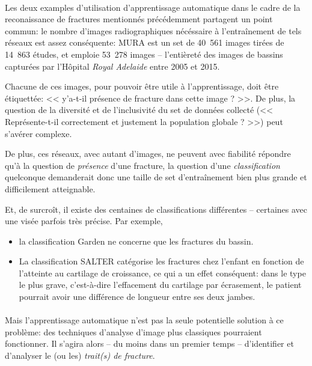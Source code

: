 \documentclass[a4paper]{article}
\begin{document}
\paragraph{}

Les deux examples d'utilisation d'apprentissage automatique dans le cadre de la reconaissance de fractures mentionnés
précédemment partagent un point commun: le nombre d'images radiographiques nécéssaire à l'entraînement de tels réseaux
est assez conséquente: MURA\cite{mura-competition} est un set de 40~561 images tirées de 14~863 études, et
\cite{detect-hip} emploie 53~278 images -- l'entièreté des images de bassins capturées par l'Hôpital \emph{Royal
Adelaide} entre 2005 et 2015.


Chacune de ces images, pour pouvoir être utile à l'apprentissage, doit être étiquettée: << y'a-t-il présence de fracture
dans cette image ? >>. De plus, la question de la diversité et de l'inclusivité du set de données collecté (<<
Représente-t-il correctement et justement la population globale ? >>) peut s'avérer complexe\cite{dataset-bias}.

De plus, ces réseaux, avec autant d'images, ne peuvent avec fiabilité répondre qu'à la question de \emph{présence} d'une
fracture, la question d'une \emph{classification} quelconque demanderait donc une taille de set d'entraînement bien plus
grande et difficilement atteignable.

Et, de surcroît, il existe des centaines de classifications différentes -- certaines avec une visée parfois très
précise.  Par exemple, 

\begin{itemize}
    \item la classification Garden\cite{garden-paper} ne concerne que les fractures du bassin.
    \item La classification SALTER\cite{salter} catégorise les fractures chez l'enfant en fonction de l'atteinte au
cartilage de croissance, ce qui a un effet conséquent: dans le type le plus grave, c'est-à-dire l'effacement du
cartilage par écrasement, le patient pourrait avoir une différence de longueur entre ses deux jambes.
\end{itemize}

\paragraph{}

Mais l'apprentissage automatique n'est pas la seule potentielle solution à ce problème: des techniques d'analyse d'image
plus classiques pourraient fonctionner.  Il s'agira alors -- du moins dans un premier temps -- d'identifier et
d'analyser le (ou les) \emph{trait(s) de fracture}.
\end{document}
